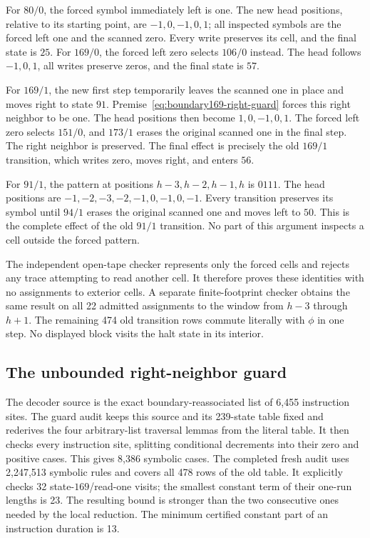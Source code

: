 For $80/0$, the forced symbol immediately left is one.  The new head
positions, relative to its starting point, are
$-1,0,-1,0,1$; all inspected symbols are the forced left one and the
scanned zero.  Every write preserves its cell, and the final state is $25$.
For $169/0$, the forced left zero selects $106/0$ instead.  The head follows
$-1,0,1$, all writes preserve zeros, and the final state is $57$.

For $169/1$, the new first step temporarily leaves the scanned one in place
and moves right to state $91$.  Premise~\eqref{eq:boundary169-right-guard}
forces this right neighbor to be one.  The head positions then become
$1,0,-1,0,1$.  The forced left zero selects $151/0$, and $173/1$ erases
the original scanned one in the final step.  The right neighbor is
preserved.  The final effect is precisely the old $169/1$ transition,
which writes zero, moves right, and enters $56$.

For $91/1$, the pattern at positions $h-3,h-2,h-1,h$ is $0111$.
The head positions are
$-1,-2,-3,-2,-1,0,-1,0,-1$.
Every transition preserves its symbol until $94/1$ erases the original
scanned one and moves left to $50$.  This is the complete effect of the
old $91/1$ transition.  No part of this argument inspects a cell outside
the forced pattern.

The independent open-tape checker represents only the forced cells and
rejects any trace attempting to read another cell.  It therefore proves
these identities with no assignments to exterior cells.  A separate
finite-footprint checker obtains the same result on all 22 admitted
assignments to the window from $h-3$ through $h+1$.  The remaining 474 old
transition rows commute literally with $\phi$ in one step.  No displayed
block visits the halt state in its interior.

\subsection{The unbounded right-neighbor guard}

The decoder source is the exact boundary-reassociated list of 6,455
instruction sites.  The guard audit keeps this source and its 239-state
table fixed and rederives the four arbitrary-list traversal lemmas from
the literal table.  It then checks every instruction site, splitting
conditional decrements into their zero and positive cases.  This gives
8,386 symbolic cases.  The completed fresh audit uses 2,247,513 symbolic
rules and covers all 478 rows of the old table.  It explicitly checks 32
state-$169$/read-one visits; the smallest constant term of their one-run
lengths is 23.  The resulting bound is stronger than the two consecutive
ones needed by the local reduction.  The minimum certified constant part
of an instruction duration is 13.

